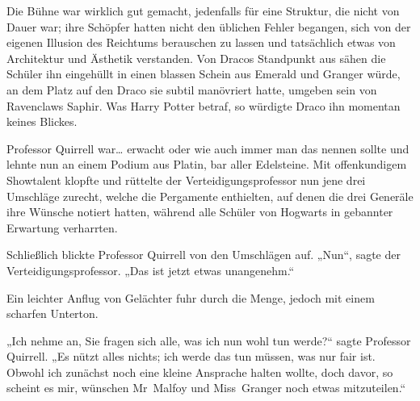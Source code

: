 Die Bühne war wirklich gut gemacht, jedenfalls für eine Struktur, die nicht von Dauer war; ihre Schöpfer hatten nicht den üblichen Fehler begangen, sich von der eigenen Illusion des Reichtums berauschen zu lassen und tatsächlich etwas von Architektur und Ästhetik verstanden. Von Dracos Standpunkt aus sähen die Schüler ihn eingehüllt in einen blassen Schein aus Emerald und Granger würde, an dem Platz auf den Draco sie subtil manövriert hatte, umgeben sein von Ravenclaws Saphir. Was Harry Potter betraf, so würdigte Draco ihn momentan keines Blickes.

Professor Quirrell war… erwacht oder wie auch immer man das nennen sollte und lehnte nun an einem Podium aus Platin, bar aller Edelsteine. Mit offenkundigem Showtalent klopfte und rüttelte der Verteidigungsprofessor nun jene drei Umschläge zurecht, welche die Pergamente enthielten, auf denen die drei Generäle ihre Wünsche notiert hatten, während alle Schüler von Hogwarts in gebannter Erwartung verharrten.

Schließlich blickte Professor Quirrell von den Umschlägen auf. „Nun“, sagte der Verteidigungsprofessor. „Das ist jetzt etwas unangenehm.“

Ein leichter Anflug von Gelächter fuhr durch die Menge, jedoch mit einem scharfen Unterton.

„Ich nehme an, Sie fragen sich alle, was ich nun wohl tun werde?“ sagte Professor Quirrell. „Es nützt alles nichts; ich werde das tun müssen, was nur fair ist. Obwohl ich zunächst noch eine kleine Ansprache halten wollte, doch davor, so scheint es mir, wünschen Mr~Malfoy und Miss~Granger noch etwas mitzuteilen.“

